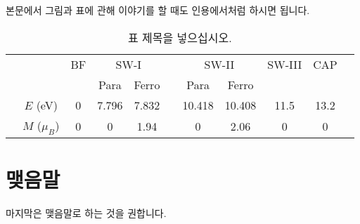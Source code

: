 \documentclass[doctor,korean,final]{kmu}
\begin{document}
본문에서 그림과 표에 관해 이야기를 할 때도 인용에서처럼 하시면 됩니다.

\begin{table}[t]
\caption{표 제목을 넣으십시오.
}
\label{mag-tab1}
\begin{center}
\begin{tabular} {ccccccccccc}
\hline\hline
& & BF &\multicolumn{2}{c}{SW-I}&&\multicolumn{2}{c}{SW-II}&SW-III&CAP&\\
\cline{4-5} \cline{7-8}
&               &   &  Para & Ferro &&   Para &  Ferro &      &      &\\
\hline
& $E$ (eV)      & 0 & 7.796 & 7.832 && 10.418 & 10.408 & 11.5 & 13.2 &\\
& $M$ ($\mu_B$) & 0 &     0 &  1.94 &&      0 &   2.06 &    0 &    0 &\\
\hline\hline
\end{tabular}
\end{center}
\end{table}



\chapter{맺음말}

마지막은 맺음말로 하는 것을 권합니다.
\end{document}
